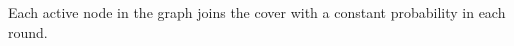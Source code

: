 \begin{prp}
  \label{prop:dgmm-log-each}
  Each active node in the graph joins the cover with a constant probability in each round.
\end{prp}
